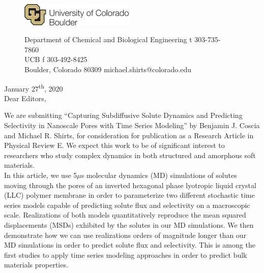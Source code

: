 \documentclass[fontsize=11pt]{article}
\begin{document}
	\graphicspath{{./figures/}}

	\begin{figure}
	\centering
	\begin{minipage}{0.37\textwidth}
	\includegraphics[width=2.14in,left]{CUBoulder.pdf}
	\end{minipage}
	\begin{minipage}{0.62\textwidth}
	\scriptsize
	\noindent Department of Chemical and Biological Engineering \hfill t 303-735-7860~~~~~~~~~~~~~~~~~~ \\
	 UCB \hfill f 303-492-8425~~~~~~~~~~~~~~~~~~ \\
	\noindent Boulder, Colorado 80309 \hfill michael.shirts@colorado.edu \\
	\end{minipage}
	\end{figure}
	
	\noindent January 27\textsuperscript{th}, 2020\\

	\noindent Dear Editors, \\
	
	\newcommand{\ManuscriptTitle}{Capturing Subdiffusive Solute Dynamics and 
	Predicting Selectivity in Nanoscale Pores with Time Series Modeling}
	
	We are submitting ``\ManuscriptTitle'' by Benjamin J. Coscia and
	Michael R.  Shirts, for consideration for publication as a Research
	Article in Physical Review E. We expect this work to be of significant
	interest to researchers who study complex dynamics in both structured
	and amorphous soft materials. \\
	
	In this article, we use 5$\mu$s molecular dynamics (MD) simulations of
	solutes moving through the pores of an inverted hexagonal phase
	lyotropic liquid crystal (LLC) polymer membrane in order to
	parameterize two different stochastic time series models capable of
	predicting solute flux and selectivity on a macroscopic scale.
	Realizations of both models quantitatively reproduce the mean squared
	displacements (MSDs) exhibited by the solutes in our MD simulations. We then
	demonstrate how we can use realizations orders of magnitude longer than
	our MD simulations in order to predict solute flux and selectivity.
	This is among the first studies to apply time series modeling
	approaches in order to predict bulk materials properties. \\
\end{document}
